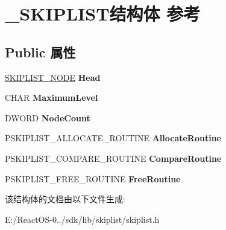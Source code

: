 \hypertarget{struct___s_k_i_p_l_i_s_t}{}\section{\+\_\+\+S\+K\+I\+P\+L\+I\+S\+T结构体 参考}
\label{struct___s_k_i_p_l_i_s_t}
\subsection*{Public 属性}
\begin{DoxyCompactItemize}
\item 
\mbox{\label{struct___s_k_i_p_l_i_s_t_a9c1251ab90e8491c079bb6397675eedc}} 
\hyperlink{struct___s_k_i_p_l_i_s_t___n_o_d_e}{S\+K\+I\+P\+L\+I\+S\+T\+\_\+\+N\+O\+DE} {\bfseries Head}
\item 
\mbox{\label{struct___s_k_i_p_l_i_s_t_a2127a2ddeb6463d3c418424f8ca0c481}} 
C\+H\+AR {\bfseries Maximum\+Level}
\item 
\mbox{\label{struct___s_k_i_p_l_i_s_t_abe03c6f21ccb18345e89992999cc6f87}} 
D\+W\+O\+RD {\bfseries Node\+Count}
\item 
\mbox{\label{struct___s_k_i_p_l_i_s_t_ad7a8de8a910cd0a57954da019d50ea4e}} 
P\+S\+K\+I\+P\+L\+I\+S\+T\+\_\+\+A\+L\+L\+O\+C\+A\+T\+E\+\_\+\+R\+O\+U\+T\+I\+NE {\bfseries Allocate\+Routine}
\item 
\mbox{\label{struct___s_k_i_p_l_i_s_t_a8385cb287b1e1423f51f957d8e9a647d}} 
P\+S\+K\+I\+P\+L\+I\+S\+T\+\_\+\+C\+O\+M\+P\+A\+R\+E\+\_\+\+R\+O\+U\+T\+I\+NE {\bfseries Compare\+Routine}
\item 
\mbox{\label{struct___s_k_i_p_l_i_s_t_abacad17488616de174f99b8dd897e319}} 
P\+S\+K\+I\+P\+L\+I\+S\+T\+\_\+\+F\+R\+E\+E\+\_\+\+R\+O\+U\+T\+I\+NE {\bfseries Free\+Routine}
\end{DoxyCompactItemize}


该结构体的文档由以下文件生成\+:\begin{DoxyCompactItemize}
\item 
E\+:/\+React\+O\+S-\/0../sdk/lib/skiplist/skiplist.\+h\end{DoxyCompactItemize}
